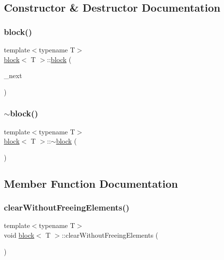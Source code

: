 \subsection{Constructor \& Destructor Documentation}
\mbox{\label{classblock_a5113ccde76ee845a786b0e1ad4b868c0}} 
\subsubsection{\texorpdfstring{block()}{block()}}
{\footnotesize\ttfamily template$<$typename T$>$ \\
\hyperlink{classblock}{block}$<$ T $>$\+::\hyperlink{classblock}{block} (\begin{DoxyParamCaption}\item[{\hyperlink{classblock}{block}$<$ T $>$ $\ast$const}]{\+\_\+next }\end{DoxyParamCaption})\hspace{0.3cm}{\ttfamily [inline]}}

\mbox{\label{classblock_a84efcb772c0aad6175b1dd456014c0b5}} 
\subsubsection{\texorpdfstring{$\sim$block()}{~block()}}
{\footnotesize\ttfamily template$<$typename T$>$ \\
\hyperlink{classblock}{block}$<$ T $>$\+::$\sim$\hyperlink{classblock}{block} (\begin{DoxyParamCaption}{ }\end{DoxyParamCaption})\hspace{0.3cm}{\ttfamily [inline]}}



\subsection{Member Function Documentation}
\mbox{\label{classblock_ab986a1662a6962895ab967a62f741649}} 
\subsubsection{\texorpdfstring{clear\+Without\+Freeing\+Elements()}{clearWithoutFreeingElements()}}
{\footnotesize\ttfamily template$<$typename T$>$ \\
void \hyperlink{classblock}{block}$<$ T $>$\+::clear\+Without\+Freeing\+Elements (\begin{DoxyParamCaption}{ }\end{DoxyParamCaption})\hspace{0.3cm}{\ttfamily [inline]}}

